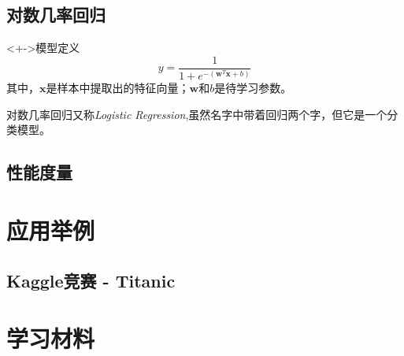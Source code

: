 \documentclass{beamer}
\begin{document}
    \subsection{对数几率回归}
    \begin{frame}
        \begin{block}<+->{模型定义}
            \begin{equation}
                y=\frac{1}{1+e^{-(\bm w^T\bm x+b)}}
            \end{equation}
            其中，$\bm x$是样本中提取出的特征向量；$\bm w$和$b$是待学习参数。
        \end{block}
        对数几率回归又称\textit{Logistic Regression},虽然名字中带着回归两个字，但它是一个分类模型。
    \end{frame}

    \subsection{性能度量}
    \begin{frame}
    \end{frame}

\section{应用举例}
    \subsection{Kaggle竞赛 - Titanic}
    \begin{frame}
    \end{frame}

\section{学习材料}
    \begin{frame}
    \end{frame}
\end{document}
